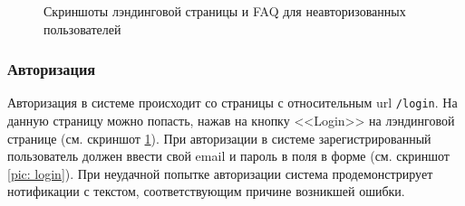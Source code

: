 \documentclass[a4paper,12pt,reqno]{article}
\begin{document}
\begin{figure}[H]
\begin{subfigure}[b]{0.475\linewidth}
		\end{subfigure}
		\caption{Скриншоты лэндинговой страницы и FAQ для неавторизованных пользователей}
		\label{pic: landing}
	\end{figure}
	
	\subsubsection{Авторизация}
	
	Авторизация в системе происходит со страницы с относительным url \texttt{/login}. На данную страницу можно попасть, нажав на кнопку <<Login>> на лэндинговой странице (см. скриншот \ref{pic: landing}). При авторизации в системе зарегистрированный пользователь должен ввести свой email и пароль в поля в форме (см. скриншот \ref{pic: login}). При неудачной попытке авторизации система продемонстрирует нотификации с текстом, соответствующим причине возникшей ошибки.  
\end{document}
